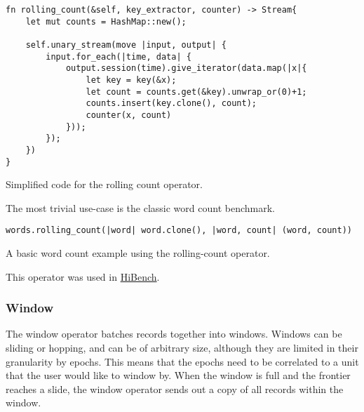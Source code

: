 \begin{listing}[H]
\begin{verbatim}
fn rolling_count(&self, key_extractor, counter) -> Stream{
    let mut counts = HashMap::new();
    
    self.unary_stream(move |input, output| {
        input.for_each(|time, data| {
            output.session(time).give_iterator(data.map(|x|{
                let key = key(&x);
                let count = counts.get(&key).unwrap_or(0)+1;
                counts.insert(key.clone(), count);
                counter(x, count)
            }));
        });
    })
}
\end{verbatim}
  \caption{Simplified code for the rolling count operator.}
  \label{lst:rolling-count}
\end{listing}

The most trivial use-case is the classic word count benchmark.

\begin{listing}[H]
\begin{verbatim}
words.rolling_count(|word| word.clone(), |word, count| (word, count))
\end{verbatim}
\caption{A basic word count example using the rolling-count operator.}
\label{lst:rolling-count-example}
\end{listing}

\noindent This operator was used in \hyperref[section:hibench]{HiBench}.

\subsubsection{Window}
The window operator batches records together into windows. Windows can be sliding or hopping, and can be of arbitrary size, although they are limited in their granularity by epochs. This means that the epochs need to be correlated to a unit that the user would like to window by. When the window is full and the frontier reaches a slide, the window operator sends out a copy of all records within the window.

